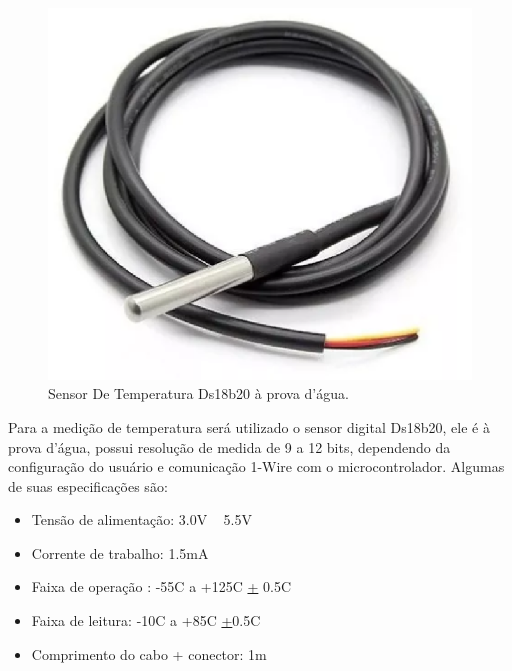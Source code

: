 \begin{figure}[H]
 \centering
   \includegraphics[keepaspectratio=true,scale=0.8]{figuras/sesortemperatura.eps}
 \caption{Sensor De Temperatura Ds18b20 à prova d’água.}
 \label{sensor_temperatura}
\end{figure}

Para a medição de temperatura será utilizado o sensor digital Ds18b20, ele é à prova d’água, possui resolução de medida de 9 a 12 bits, dependendo da configuração do usuário e comunicação 1-Wire com o microcontrolador. Algumas de suas especificações são:
\begin{itemize}
\item Tensão de alimentação: 3.0V ~ 5.5V
\item Corrente de trabalho: 1.5mA
\item Faixa de operação : -55{\degree}C  a +125{\degree}C  \underline{+} 0.5{\degree}C
\item Faixa de leitura: -10{\degree}C  a +85{\degree}C  \underline{+}0.5{\degree}C
\item Comprimento do cabo + conector: 1m
\end{itemize}


